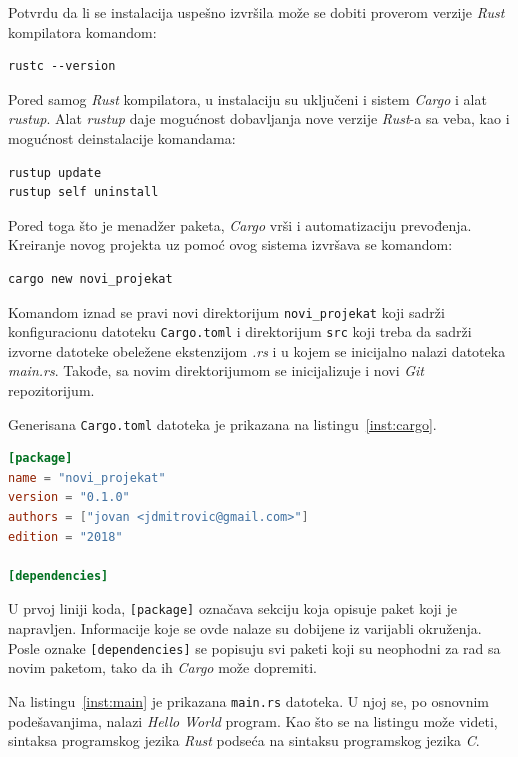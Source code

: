 \documentclass[12pt,oneside]{memoir}
\begin{document}
\noindent
Potvrdu da li se instalacija uspešno izvršila može se dobiti proverom verzije
\emph{Rust} kompilatora komandom:

\begin{lstlisting}[language={}, style=text]
rustc --version
\end{lstlisting}

Pored samog \emph{Rust} kompilatora, u instalaciju su uključeni i
sistem \emph{Cargo} i alat \emph{rustup}. Alat \emph{rustup} daje mogućnost
dobavljanja nove verzije \emph{Rust}-a sa veba, kao i
mogućnost deinstalacije komandama:

\begin{lstlisting}[language={}, style=text]
rustup update
rustup self uninstall
\end{lstlisting}

Pored toga što je menadžer paketa, \emph{Cargo} vrši i automatizaciju
prevođenja. Kreiranje novog projekta uz pomoć ovog sistema izvršava
se komandom:

\begin{lstlisting}[language={}, style=text]
cargo new novi_projekat
\end{lstlisting}

Komandom iznad se pravi novi direktorijum \texttt{novi\_projekat} koji
sadrži konfiguracionu datoteku \texttt{Cargo.toml} i direktorijum \texttt{src}
koji treba da sadrži izvorne datoteke obeležene ekstenzijom \emph{.rs}
i u kojem se inicijalno nalazi datoteka \emph{main.rs}. Takođe, sa novim direktorijumom se
inicijalizuje i novi \emph{Git} repozitorijum.

Generisana \texttt{Cargo.toml} datoteka je prikazana na listingu~\ref{inst:cargo}.

\begin{lstlisting}[language=TOML,
                   caption={Inicijalna \emph{Cargo.toml} datoteka},
                   label={inst:cargo}]
[package]
name = "novi_projekat"
version = "0.1.0"
authors = ["jovan <jdmitrovic@gmail.com>"]
edition = "2018"

[dependencies]
\end{lstlisting}

U prvoj liniji koda, \texttt{[package]} označava sekciju koja opisuje
paket koji je napravljen. Informacije koje se ovde nalaze su dobijene
iz varijabli okruženja. Posle oznake \texttt{[dependencies]} se
popisuju svi paketi koji su neophodni za rad sa novim paketom,
tako da ih \emph{Cargo} može dopremiti.

Na listingu~\ref{inst:main} je prikazana \texttt{main.rs} datoteka. U njoj se, po osnovnim
podešavanjima, nalazi \emph{Hello World} program. Kao što se na listingu može videti,
sintaksa programskog jezika \textit{Rust} podseća na sintaksu programskog jezika
\textit{C}.
\end{document}
